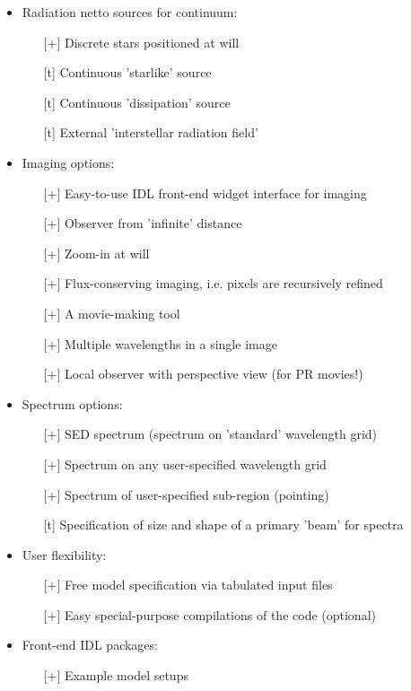 \documentclass{report}
\begin{document}
\begin{itemize}
\begin{itemize}
  \end{itemize}
\item Radiation netto sources for continuum:
  \begin{itemize}
    \item[][+] Discrete stars positioned at will
    \item[][t] Continuous 'starlike' source
    \item[][t] Continuous 'dissipation' source
    \item[][t] External 'interstellar radiation field'
  \end{itemize}
\item Imaging options:
  \begin{itemize}
    \item[][+] Easy-to-use IDL front-end widget interface for imaging
    \item[][+] Observer from 'infinite' distance
    \item[][+] Zoom-in at will
    \item[][+] Flux-conserving imaging, i.e. pixels are recursively refined
    \item[][+] A movie-making tool
    \item[][+] Multiple wavelengths in a single image
    \item[][+] Local observer with perspective view (for PR movies!)
  \end{itemize}
\item Spectrum options:
  \begin{itemize}
    \item[][+] SED spectrum (spectrum on 'standard' wavelength grid)
    \item[][+] Spectrum on any user-specified wavelength grid
    \item[][+] Spectrum of user-specified sub-region (pointing)
    \item[][t] Specification of size and shape of a primary 'beam' for spectra
  \end{itemize}
\item User flexibility:
  \begin{itemize}
    \item[][+] Free model specification via tabulated input files
    \item[][+] Easy special-purpose compilations of the code (optional)
  \end{itemize}
\item Front-end IDL packages:
  \begin{itemize}
    \item[][+] Example model setups

\end{itemize}
\end{itemize}
\end{document}
